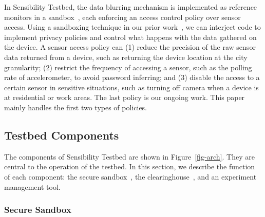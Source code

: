 In Sensibility Testbed, the data blurring 
mechanism is implemented as reference monitors in a 
sandbox~\cite{ref}, each enforcing an access control 
policy over sensor access. Using a sandboxing 
technique in our prior work~\cite{cappos2010retaining}, we can 
interject code to implement privacy policies and control what 
happens with the data gathered on the device. A sensor access 
policy can (1) reduce 
the precision of the raw sensor data returned from a device, such
as returning the device location at the city granularity; (2) restrict 
the frequency of accessing a sensor, such as the polling rate of 
accelerometer, to avoid password inferring; and (3) disable the 
access to a certain sensor in sensitive situations, such as 
turning off camera when a device is at residential or work areas.
The last policy is our ongoing work. This paper mainly handles
the first two types of policies. 

\subsection{Testbed Components}\label{sec-component}

The components of Sensibility Testbed are shown in Figure~\ref{fig-arch}.
They are central to the operation of the testbed. 
In this section, we describe the function of each component: the
secure sandbox~\cite{cappos2010retaining}, the clearinghouse~\cite{ch}, 
and an experiment management tool.

\subsubsection{Secure Sandbox}\label{sec-repy}

